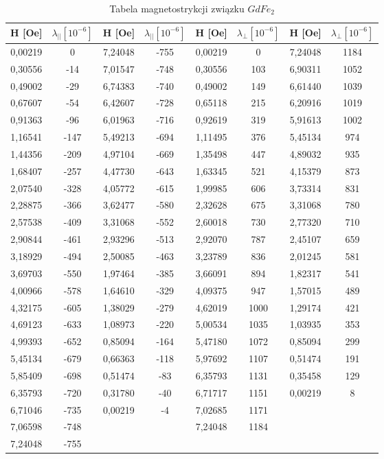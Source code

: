 \documentclass[a4paper,12pt]{article}
\numberwithin{equation}{section}
\begin{document}
\begin{appendices}
  \label{GdMagnetoTab}
  \scriptsize
  \begin{longtable}[c]{|c|c|c|c|c|c|c|c|}
\caption{Tabela magnetostrykcji związku $GdFe_2$}\\
\hline
H [Oe]	&	$\lambda_{||} [10^{-6}]	$ 	&	H [Oe]	&	$\lambda_{||}  [10^{-6}]	$	&	H [Oe]	&	$\lambda_{\perp}  [10^{-6}]$		&	H [Oe]	&	$\lambda_{\perp} [10^{-6}]$	\\\hline\hline
0,00219	&	0	&	7,24048	&	-755	&	0,00219	&	0	&	7,24048	&	1184	\\\hline
0,30556	&	-14	&	7,01547	&	-748	&	0,30556	&	103	&	6,90311	&	1052	\\\hline
0,49002	&	-29	&	6,74383	&	-740	&	0,49002	&	149	&	6,61440	&	1039	\\\hline
0,67607	&	-54	&	6,42607	&	-728	&	0,65118	&	215	&	6,20916	&	1019	\\\hline
0,91363	&	-96	&	6,01963	&	-716	&	0,92619	&	319	&	5,91613	&	1002	\\\hline
1,16541	&	-147	&	5,49213	&	-694	&	1,11495	&	376	&	5,45134	&	974	\\\hline
1,44356	&	-209	&	4,97104	&	-669	&	1,35498	&	447	&	4,89032	&	935	\\\hline
1,68407	&	-257	&	4,47730	&	-643	&	1,63345	&	521	&	4,15379	&	873	\\\hline
2,07540	&	-328	&	4,05772	&	-615	&	1,99985	&	606	&	3,73314	&	831	\\\hline
2,28875	&	-366	&	3,62477	&	-580	&	2,32628	&	675	&	3,31068	&	780	\\\hline
2,57538	&	-409	&	3,31068	&	-552	&	2,60018	&	730	&	2,77320	&	710	\\\hline
2,90844	&	-461	&	2,93296	&	-513	&	2,92070	&	787	&	2,45107	&	659	\\\hline
3,18929	&	-494	&	2,50085	&	-463	&	3,23789	&	836	&	2,01245	&	581	\\\hline
3,69703	&	-550	&	1,97464	&	-385	&	3,66091	&	894	&	1,82317	&	541	\\\hline
4,00966	&	-578	&	1,64610	&	-329	&	4,09375	&	947	&	1,57015	&	489	\\\hline
4,32175	&	-605	&	1,38029	&	-279	&	4,62019	&	1000	&	1,29174	&	421	\\\hline
4,69123	&	-633	&	1,08973	&	-220	&	5,00534	&	1035	&	1,03935	&	353	\\\hline
4,99393	&	-652	&	0,85094	&	-164	&	5,47180	&	1072	&	0,85094	&	299	\\\hline
5,45134	&	-679	&	0,66363	&	-118	&	5,97692	&	1107	&	0,51474	&	191	\\\hline
5,85409	&	-698	&	0,51474	&	-83	&	6,35793	&	1131	&	0,35458	&	129	\\\hline
6,35793	&	-720	&	0,31780	&	-40	&	6,71717	&	1151	&	0,00219	&	8	\\\hline
6,71046	&	-735	&	0,00219	&	-4	&	7,02685	&	1171	&	 \multicolumn{2}{c|}{}\\\cline{1-6}
7,06598	&	-748	&	 \multicolumn{2}{c|}{}	&	7,24048	&	1184	&	 \multicolumn{2}{c|}{}\\\cline{1-2}\cline{5-6}
7,24048	&	-755	&		 \multicolumn{6}{c|}{}				\\\hline
\end{longtable}



\end{appendices}
\end{document}
